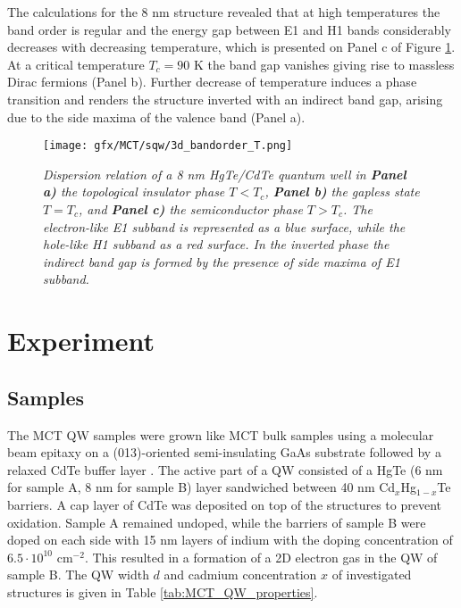\documentclass[titlepage,a4paper]{book}
\newcommand{\wciecie}{\quad\phantom{v}}
\begin{document}
The calculations for the 8 nm structure revealed that at high temperatures the band order is regular and the energy gap between E1 and H1 bands considerably decreases with decreasing temperature, which is presented on Panel c of Figure \ref{fig:3D_bandorder_HgTe}. At a critical temperature $T_c = 90$ K the band gap vanishes giving rise to massless Dirac fermions (Panel b). Further decrease of temperature induces a phase transition and renders the structure inverted with an indirect band gap, arising due to the side maxima of the valence band (Panel a).

 
\begin{figure}[ht]
	\centering
	\texttt{[image: gfx/MCT/sqw/3d\_bandorder\_T.png]}
	\vspace{-10pt}
	\caption{\textit{Dispersion relation of a 8 nm HgTe/CdTe quantum well in \textbf{Panel a)} the topological insulator phase $T < T_c$, \textbf{Panel b)} the gapless state $T = T_c$, and \textbf{Panel c)} the semiconductor phase $T > T_c$. The electron-like E1 subband is represented as a blue surface, while the hole-like H1 subband as a red surface. In the inverted phase the indirect band gap is formed by the presence of side maxima of E1 subband.}}
	\label{fig:3D_bandorder_HgTe}
\end{figure} 

\clearpage
\section{Experiment}
\subsection{Samples}
\wciecie
The MCT QW samples were grown like MCT bulk samples using a molecular beam epitaxy on a (013)-oriented semi-insulating GaAs substrate followed by a relaxed CdTe buffer layer \cite{Dvoretsky_Samples}. The active part of a QW consisted of a HgTe (6 nm for sample A, 8 nm for sample B) layer sandwiched between 40 nm Cd$_x$Hg$_{1-x}$Te barriers. A cap layer of CdTe was deposited on top of the structures to prevent oxidation. Sample A remained undoped, while the barriers of sample B were doped on each side with 15 nm layers of indium with the doping concentration of $6.5\cdot10^{10}$ cm$^{-2}$. This resulted in a formation of a 2D electron gas in the QW of sample B. The QW width $d$ and cadmium concentration $x$ of investigated structures is given in Table \ref{tab:MCT_QW_properties}.   
\end{document}
